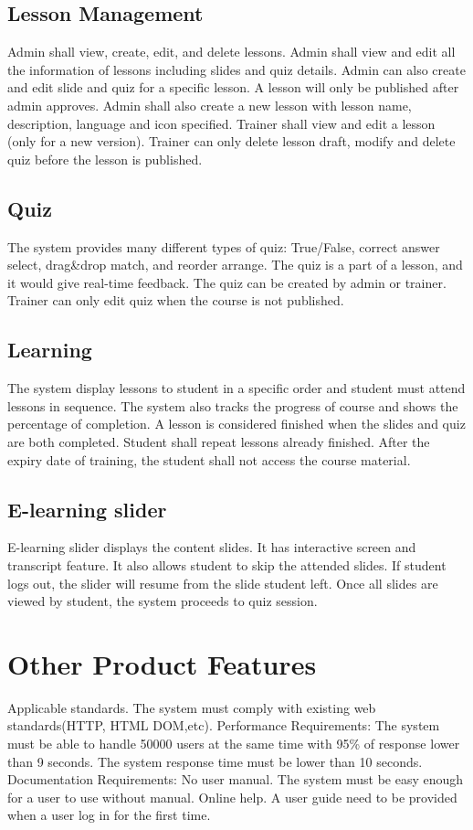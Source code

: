 \documentclass[a4paper]{article}
\begin{document}
\subsection{Lesson Management}
Admin shall view, create, edit, and delete lessons. Admin shall view and edit all the information of lessons including slides and quiz details. Admin can also create and edit slide and quiz for a specific lesson. A lesson will only be published after admin approves. Admin shall also create a new lesson with lesson name, description, language and icon specified.
Trainer shall view and edit a lesson (only for a new version). Trainer can only delete lesson draft, modify and delete quiz before the lesson is published.
\bigskip
\subsection{Quiz}
The system provides many different types of quiz: True/False, correct answer select, drag\&drop match, and reorder arrange. The quiz is a part of a lesson, and it would give real-time feedback. The quiz can be created by admin or trainer. Trainer can only edit quiz when the course is not published.
\bigskip
\subsection{Learning}
The system display lessons to student in a specific order and student must attend lessons in sequence. The system also tracks the progress of course and shows the percentage of completion. A lesson is considered finished when the slides and quiz are both completed. Student shall repeat lessons already finished. After the expiry date of training, the student shall not access the course material. 
\bigskip
\subsection{E-learning slider}
E-learning slider displays the content slides. It has interactive screen and transcript feature. It also allows student to skip the attended slides. If student logs out, the slider will resume from the slide student left. Once all slides are viewed by student, the system proceeds to quiz session. 
\bigskip


\section{Other Product Features}
Applicable standards. The system must comply with existing web standards(HTTP, HTML DOM,etc).
Performance Requirements:
The system must be able to handle 50000 users at the same time with 95\% of response lower than 9 seconds. 
The system response time must be lower than 10 seconds.
Documentation Requirements: 
No user manual. The system must be easy enough for a user to use without manual.
Online help. A user guide need to be provided when a user log in for the first time.
\end{document}
